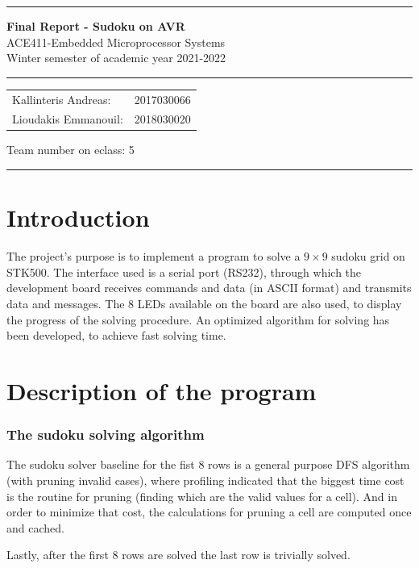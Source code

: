 \documentclass[12pt, a4, hidelinks]{article}
\begin{document}
\noindent \rule{\textwidth}{3pt}
\begin{center}
	{\bf \Large{Final Report - Sudoku on AVR}}\\
	ACE411-Embedded Microprocessor Systems \\
	Winter semester of academic year 2021-2022
	\rule{\textwidth}{0.2mm} 
	\begin{tabular}{l r}
		Kallinteris Andreas:& 2017030066 \\ 
		Lioudakis Emmanouil:      &2018030020 
	\end{tabular} \vrule \hspace{3mm}
	\indent	Team number on eclass:  5
	\rule{\textwidth}{1pt}
\end{center}

\section*{Introduction}
The project's purpose is to implement a program to solve a $9\times9$ sudoku grid on STK500. The interface used is a serial port (RS232), through which the development board receives commands and data (in ASCII format) and transmits data and messages. The 8 LEDs available on the board are also used, to display the progress of the solving procedure. An optimized algorithm for solving has been developed, to achieve fast solving time.


\section*{Description of the program}

\subsubsection*{The sudoku solving algorithm}
The sudoku solver baseline for the fist 8 rows is a general purpose DFS algorithm (with pruning invalid cases), where profiling indicated that the biggest time cost is the routine for pruning (finding which are the valid values for a cell).
And in order to minimize that cost, the calculations for pruning a cell are computed once and cached.

\noindent Lastly, after the first 8 rows are solved the last row is trivially solved.
\end{document}

